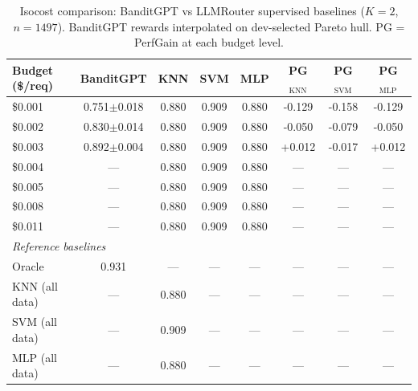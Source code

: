 \begin{table}[htbp]
\centering
\caption{Isocost comparison: BanditGPT vs LLMRouter supervised baselines ($K{=}2$, $n{=}1497$). BanditGPT rewards interpolated on dev-selected Pareto hull. PG = PerfGain at each budget level.}
\label{tab:isocost_k2}
\small
\begin{tabular}{lccccccc}
\toprule
Budget (\$/req) & BanditGPT & KNN & SVM & MLP & PG$_{\mathrm{KNN}}$ & PG$_{\mathrm{SVM}}$ & PG$_{\mathrm{MLP}}$ \\
\midrule
\$0.001 & 0.751$\pm$0.018 & 0.880 & 0.909 & 0.880 & -0.129 & -0.158 & -0.129 \\
\$0.002 & 0.830$\pm$0.014 & 0.880 & 0.909 & 0.880 & -0.050 & -0.079 & -0.050 \\
\$0.003 & 0.892$\pm$0.004 & 0.880 & 0.909 & 0.880 & +0.012 & -0.017 & +0.012 \\
\$0.004 & --- & 0.880 & 0.909 & 0.880 & --- & --- & --- \\
\$0.005 & --- & 0.880 & 0.909 & 0.880 & --- & --- & --- \\
\$0.008 & --- & 0.880 & 0.909 & 0.880 & --- & --- & --- \\
\$0.011 & --- & 0.880 & 0.909 & 0.880 & --- & --- & --- \\
\midrule
\multicolumn{8}{l}{\textit{Reference baselines}} \\
Oracle & 0.931 & --- & --- & --- & --- & --- & --- \\
KNN (all data) & --- & 0.880 & --- & --- & --- & --- & --- \\
SVM (all data) & --- & 0.909 & --- & --- & --- & --- & --- \\
MLP (all data) & --- & 0.880 & --- & --- & --- & --- & --- \\
\bottomrule
\end{tabular}
\end{table}
